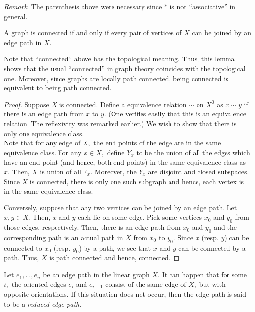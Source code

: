 \documentclass[12pt]{article}
\begin{document}
\emph{Remark.} The parenthesis above were necessary since $*$ is not ``associative'' in general.

\begin{lem} \label{lem:connectedgraphpaths}
	A graph is connected if and only if every pair of vertices of $X$ can be joined by an edge path in $X.$
\end{lem}
Note that ``connected'' above has the topological meaning. Thus, this lemma shows that the usual ``connected'' in graph theory coincides with the topological one. Moreover, since graphs are locally path connected, being connected is equivalent to being path connected.

\begin{proof} 
	Suppose $X$ is connected. Define a equivalence relation $\sim$ on $X^0$ as $x \sim y$ if there is an edge path from $x$ to $y.$ (One verifies easily that this is an equivalence relation. The reflexivity was remarked earlier.) We wish to show that there is only one equivalence class.\\
	Note that for any edge of $X,$ the end points of the edge are in the same equivalence class. For any $x \in X,$ define $Y_x$ to be the union of all the edges which have an end point (and hence, both end points) in the same equivalence class as $x.$ Then, $X$ is union of all $Y_x.$ Moreover, the $Y_x$ are disjoint and closed subspaces. Since $X$ is connected, there is only one such subgraph and hence, each vertex is in the same equivalence class.

	Conversely, suppose that any two vertices can be joined by an edge path. Let $x, y \in X.$ Then, $x$ and $y$ each lie on some edge. Pick some vertices $x_0$ and $y_0$ from those edges, respectively. Then, there is an edge path from $x_0$ and $y_0$ and the corresponding path is an actual path in $X$ from $x_0$ to $y_0.$ Since $x$ (resp. $y$) can be connected to $x_0$ (resp. $y_0$) by a path, we see that $x$ and $y$ can be connected by a path. Thus, $X$ is path connected and hence, connected.
\end{proof}

\begin{defn}
	Let $e_1, \ldots, e_n$ be an edge path in the linear graph $X.$ It can happen that for some $i,$ the oriented edges $e_i$ and $e_{i+1}$ consist of the same edge of $X,$ but with opposite orientations. If this situation does not occur, then the edge path is said to be a \emph{reduced edge path}.
\end{defn}
\end{document}
